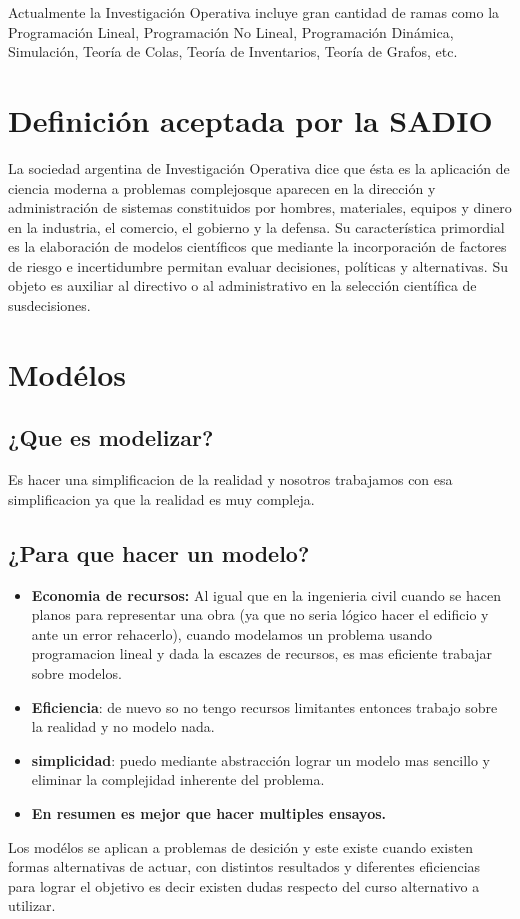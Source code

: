 \documentclass[12pt]{book}
\begin{document}
Actualmente la Investigación Operativa incluye gran cantidad de ramas como la Programación Lineal, Programación No Lineal, Programación Dinámica, Simulación, Teoría de Colas, Teoría de Inventarios, Teoría de Grafos, etc.

\section{Definición aceptada por la SADIO}
La sociedad argentina de Investigación Operativa dice que \'esta es la aplicación de ciencia moderna a problemas complejosque aparecen en la dirección y administración de sistemas constituidos por hombres,
materiales, equipos y dinero en la industria, el comercio, el gobierno y la defensa. Su característica primordial es la elaboración de modelos científicos que mediante la incorporación de factores de riesgo e incertidumbre permitan evaluar decisiones, políticas y alternativas. Su objeto es auxiliar al directivo o al administrativo en la selección científica de susdecisiones.

\section{Mod\'elos}
\subsection{¿Que es modelizar?} Es hacer una simplificacion de la realidad y nosotros trabajamos con esa simplificacion ya que la realidad es muy compleja.
\subsection{¿Para que hacer un modelo?}
\begin{itemize}
\item \textbf{Economia de recursos:} Al igual que en la ingenieria civil cuando se hacen planos para representar una obra (ya que no seria l\'ogico hacer el edificio y ante un error rehacerlo), cuando modelamos un problema usando programacion lineal y dada la escazes de recursos, es mas eficiente trabajar sobre modelos.
\item \textbf{Eficiencia}: de nuevo so no tengo recursos limitantes entonces trabajo sobre la realidad y no modelo nada.
\item \textbf{simplicidad}: puedo mediante abstracci\'on lograr un modelo mas sencillo y eliminar la complejidad inherente del problema.
\item \textbf{En resumen es mejor que hacer multiples ensayos.}
\end{itemize}
Los mod\'elos se aplican a problemas de desici\'on y este existe cuando existen formas alternativas de actuar, con distintos resultados y diferentes eficiencias para lograr el objetivo es decir existen dudas respecto del curso alternativo a utilizar.
\end{document}
